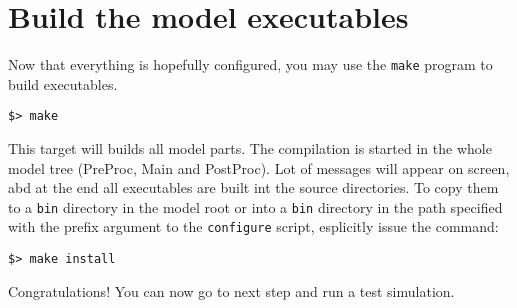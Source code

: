 \section{Build the model executables}

Now that everything is hopefully configured, you may use the \verb=make=
program to build executables.

\begin{Verbatim}
$> make
\end{Verbatim}

This target will builds all model parts. 
The compilation is started in the whole model tree (PreProc, Main and PostProc).
Lot of messages will appear on screen, abd at the end all executables are built
int the source directories.
To copy them to a \verb=bin= directory in the model root or into a \verb=bin=
directory in the path specified with the prefix argument to the \verb=configure=
script, esplicitly issue the command:

\begin{Verbatim}
$> make install
\end{Verbatim}

Congratulations! You can now go to next step and run a test simulation.
